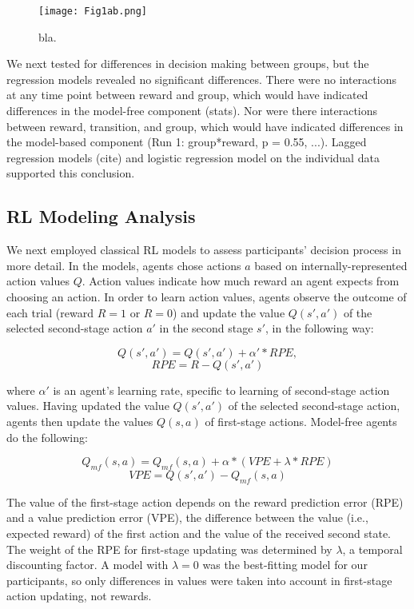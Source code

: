 \documentclass[11pt]{article} %
\begin{document}
\begin{figure}
	\texttt{[image: Fig1ab.png]}
	\caption{bla.}
	\label{Fig1}
\end{figure}

We next tested for differences in decision making between groups, but the regression models revealed no significant differences. There were no interactions at any time point between reward and group, which would have indicated differences in the model-free component (stats). Nor were there interactions between reward, transition, and group, which would have indicated differences in the model-based component (Run 1: group*reward, p = 0.55, ...). Lagged regression models (cite) and logistic regression model on the individual data supported this conclusion.

\subsection{RL Modeling Analysis}
We next employed classical RL models to assess participants' decision process in more detail. In the models, agents chose actions $a$ based on internally-represented action values $Q$. Action values indicate how much reward an agent expects from choosing an action. In order to learn action values, agents observe the outcome of each trial (reward $R = 1$ or $R = 0$) and update the value $Q(s', a')$ of the selected second-stage action $a'$ in the second stage $s'$, in the following way:

\begin{equation}
Q(s', a') = Q(s', a') + \alpha' * RPE,
\end{equation}
\begin{equation}
RPE = R - Q(s', a')
\end{equation}

where $ \alpha' $ is an agent's learning rate, specific to learning of second-stage action values. Having updated the value $Q(s', a')$ of the selected second-stage action, agents then update the values $Q(s, a)$ of first-stage actions. Model-free agents do the following:

\begin{equation}
Q_{mf}(s, a) = Q_{mf}(s, a) + \alpha * (VPE + \lambda * RPE)
\end{equation}
\begin{equation}
VPE = Q(s', a') - Q_{mf}(s, a)
\end{equation}

The value of the first-stage action depends on the reward prediction error (RPE) and a value prediction error (VPE), the difference between the value (i.e., expected reward) of the first action and the value of the received second state. The weight of the RPE for first-stage updating was determined by $ \lambda $, a temporal discounting factor. A model with $ \lambda = 0 $ was the best-fitting model for our participants, so only differences in values were taken into account in first-stage action updating, not rewards.
\end{document}
